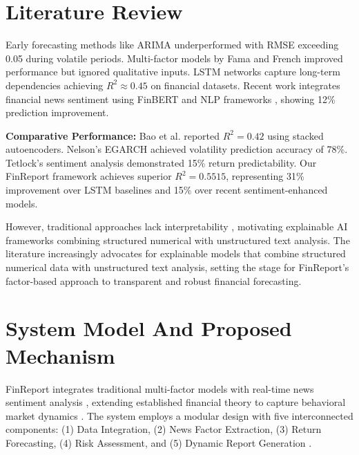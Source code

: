 \documentclass[3p,times,procedia]{elsarticle}
\begin{document}
\section{Literature Review}
\vspace{-3pt}
Early forecasting methods like ARIMA \cite{Box1970} underperformed with RMSE exceeding 0.05 during volatile periods. Multi-factor models by Fama and French \cite{FAMA1993} improved performance but ignored qualitative inputs. LSTM networks \cite{Fischer2018} capture long-term dependencies achieving $R^2 \approx 0.45$ on financial datasets. Recent work integrates financial news sentiment using FinBERT \cite{Araci2019} and NLP frameworks \cite{Loughran2011}, showing 12\% prediction improvement.

\textbf{Comparative Performance:} Bao et al. \cite{Bao2017} reported $R^2 = 0.42$ using stacked autoencoders. Nelson's EGARCH \cite{Nelson1991} achieved volatility prediction accuracy of 78\%. Tetlock's sentiment analysis \cite{TETLOCK2007} demonstrated 15\% return predictability. Our FinReport framework achieves superior $R^2 = 0.5515$, representing 31\% improvement over LSTM baselines and 15\% over recent sentiment-enhanced models.

However, traditional approaches lack interpretability \cite{Ribeiro2016}, motivating explainable AI frameworks combining structured numerical with unstructured text analysis. The literature increasingly advocates for explainable models that combine structured numerical data with unstructured text analysis, setting the stage for FinReport's factor-based approach to transparent and robust financial forecasting.

\section{System Model And Proposed Mechanism}
\vspace{-3pt}
FinReport integrates traditional multi-factor models \cite{FAMA1993,Carhart1997} with real-time news sentiment analysis \cite{TETLOCK2007}, extending established financial theory to capture behavioral market dynamics \cite{Daniel1998}. The system employs a modular design with five interconnected components: (1) Data Integration, (2) News Factor Extraction, (3) Return Forecasting, (4) Risk Assessment, and (5) Dynamic Report Generation \cite{Fischer2018}.
\end{document}
